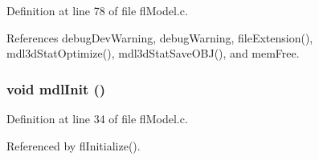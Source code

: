 Definition at line 78 of file fl\-Model.c.

References debug\-Dev\-Warning, debug\-Warning, file\-Extension(), mdl3d\-Stat\-Optimize(), mdl3d\-Stat\-Save\-OBJ(), and mem\-Free.
\subsubsection{\setlength{\rightskip}{0pt plus 5cm}void mdl\-Init ()}\label{flModel_8c_f881fa3ed05c8767efb292b84b836af3}




Definition at line 34 of file fl\-Model.c.

Referenced by fl\-Initialize().